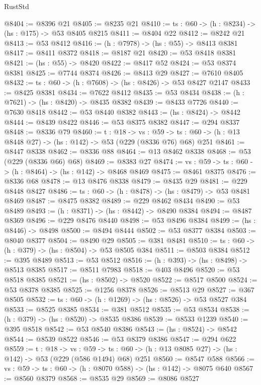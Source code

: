\begin{lexlean}{RustStd}
\begin{coremodule}
@8404 := @8396 @21
@8405 := @8235 @21
@8410 := {ts : @60} -> (h : @8234) -> (hs : @175) -> @53 @8405 @8215
@8411 := @8404 @22
@8412 := @8242 @21
@8413 := @53 @8412
@8416 := (h : @7978) -> (hs : @55) -> @8413 @8381
@8417 := @8411 @8372
@8418 := @8187 @21
@8420 := @53 @8418 @8381
@8421 := (hs : @55) -> @8420
@8422 := @8417 @52
@8424 := @53 @8374 @8381
@8425 := @7744 @8374
@8426 := @8413 @29
@8427 := @7610 @8405
@8432 := {ts : @60} -> (h : @7608) -> (hs : @8426) -> @53 @8427 @2147
@8433 := @8425 @8381
@8434 := @7622 @8412
@8435 := @53 @8434
@8438 := (h : @7621) -> (hs : @8420) -> @8435 @8382
@8439 := @8433 @7726
@8440 := @7630 @8418
@8442 := @53 @8440 @8382
@8443 := (hs : @8424) -> @8442
@8444 := @8439 @8422
@8446 := @53 @8375 @8382
@8447 := @294 @8337
@8448 := @8336 @79
@8460 := {t : @18} ->
  {vs : @59} -> {ts : @60} -> (h : @13 @8448 @27) -> (hs : @142) -> @53 (@229 (@8336 @76) @68) @251
@8461 := @8447 @8338
@8462 := @8336 @88
@8464 := @13 @8462 @8338
@8468 := @53 (@229 (@8336 @66) @68)
@8469 := @8383 @27
@8474 := {vs : @59} -> {ts : @60} -> (h : @8464) -> (hs : @142) -> @8468 @8469
@8475 := @8461 @8375
@8476 := @8336 @68
@8478 := @13 @8476 @8338
@8479 := @8435 @29
@8481 := @229 @8448 @8427
@8486 := {ts : @60} -> (h : @8478) -> (hs : @8479) -> @53 @8481 @8469
@8487 := @8475 @8382
@8489 := @229 @8462 @8434
@8490 := @53 @8489
@8493 := (h : @8371) -> (hs : @8442) -> @8490 @8384
@8494 := @8487 @8369
@8496 := @229 @8476 @8440
@8498 := @53 @8496 @8384
@8499 := (hs : @8446) -> @8498
@8500 := @8494 @8444
@8502 := @53 @8377 @8384
@8503 := @8040 @8377
@8504 := @8490 @29
@8505 := @381 @8481
@8510 := {ts : @60} -> (h : @379) -> (hs : @8504) -> @53 @8505 @384
@8511 := @8503 @8384
@8512 := @395 @8489
@8513 := @53 @8512
@8516 := (h : @393) -> (hs : @8498) -> @8513 @8385
@8517 := @8511 @7983
@8518 := @403 @8496
@8520 := @53 @8518 @8385
@8521 := (hs : @8502) -> @8520
@8522 := @8517 @8500
@8524 := @53 @8378 @8385
@8525 := @1256 @8378
@8526 := @8513 @29
@8527 := @367 @8505
@8532 := {ts : @60} -> (h : @1269) -> (hs : @8526) -> @53 @8527 @384
@8533 := @8525 @8385
@8534 := @381 @8512
@8535 := @53 @8534
@8538 := (h : @379) -> (hs : @8520) -> @8535 @8386
@8539 := @8533 @1239
@8540 := @395 @8518
@8542 := @53 @8540 @8386
@8543 := (hs : @8524) -> @8542
@8544 := @8539 @8522
@8546 := @53 @8379 @8386
@8547 := @294 @622
@8559 := {t : @18} ->
  {vs : @59} -> {ts : @60} -> (h : @13 @8085 @27) -> (hs : @142) -> @53 (@229 (@586 @1494) @68) @251
@8560 := @8547 @588
@8566 := {vs : @59} -> {ts : @60} -> (h : @8070 @588) -> (hs : @142) -> @8075 @640
@8567 := @8560 @8379
@8568 := @8535 @29
@8569 := @8086 @8527

\end{coremodule}
\end{lexlean}
